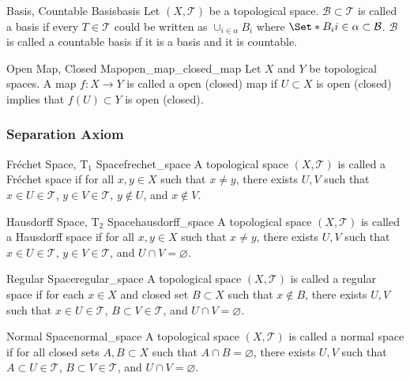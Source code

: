 \documentclass{article}
\begin{document}
\begin{definition}{Basis, Countable Basis}{basis}
    Let $(X,\mathcal{T})$ be a topological space.
    $\mathcal{B} \subset \mathcal{T}$ is called a basis if every $T\in \mathcal{T}$ could be written as $\cup_{i\in \alpha} B_i$ where $\Set*{B_i}{i\in\alpha}\subset \mathcal{B}$.
    $\mathcal{B}$ is called a countable basis if it is a basis and it is countable.
\end{definition}

\begin{definition}{Open Map, Closed Map}{open_map_closed_map}
    Let $X$ and $Y$ be topological spaces.
    A map $f:X\rightarrow Y$ is called a open (closed) map if $U\subset X$ is open (closed) implies that $f(U)\subset Y$ is open (closed).
\end{definition}

\subsubsection{Separation Axiom}

\begin{definition}{Fr\'echet Space, $\mathrm{T}_1$ Space}{frechet_space}
    A topological space $(X,\mathcal{T})$ is called a Fr\'echet space if for all $x,y\in X$ such that $x\neq y$, there exists $U,V$ such that $x\in U \in \mathcal{T}$, $y\in V\in \mathcal{T}$, $y\notin U$, and $x\notin V$.
\end{definition}

\begin{definition}{Hausdorff Space, $\mathrm{T}_2$ Space}{hausdorff_space}
    A topological space $(X,\mathcal{T})$ is called a Hausdorff space if for all $x,y\in X$ such that $x\neq y$, there exists $U,V$ such that $x\in U \in \mathcal{T}$, $y\in V\in \mathcal{T}$, and $U\cap V = \varnothing$.
\end{definition}

\begin{definition}{Regular Space}{regular_space}
    A topological space $(X,\mathcal{T})$ is called a regular space if for each $x\in X$ and closed set $B\subset X$ such that $x\notin B$, there exists $U,V$ such that $x\in U \in \mathcal{T}$, $B\subset V\in \mathcal{T}$, and $U\cap V = \varnothing$.
\end{definition}

\begin{definition}{Normal Space}{normal_space}
    A topological space $(X,\mathcal{T})$ is called a normal space if for all closed sets $A,B\subset X$ such that $A\cap B = \varnothing$, there exists $U,V$ such that $A\subset U \in \mathcal{T}$, $B\subset V\in \mathcal{T}$, and $U\cap V = \varnothing$.
\end{definition}
\end{document}
